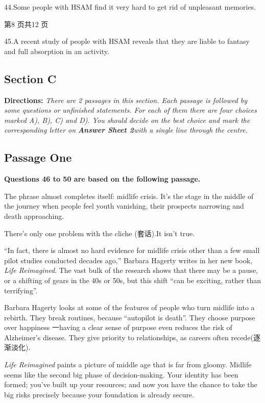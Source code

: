 \documentclass[UTF8,11pt]{ctexart}
\begin{document}
44.Some people with HSAM find it very hard to get rid of unpleasant memories.


第8 页共12 页


45.A recent study of people with HSAM reveals that they are liable to fantasy and full absorption in an activity.


\subsection*{\textbf{Section C}}


\textbf{Directions:}\textit{ There are 2 passages in this section. Each passage is followed by some questions or} \textit{unfinished statements. For each of them there are four choices marked A), B), C) and D). You should} \textit{decide on the best choice and mark the corresponding letter on}\textbf{\textit{ Answer Sheet 2}}\textit{with a single line through} \textit{the centre.}


\subsection*{\textbf{Passage One}}


\textbf{Questions 46 to 50 are based on the following passage.}


The phrase almost completes itself: midlife crisis. It’s the stage in the middle of the journey when people feel youth vanishing, their prospects narrowing and death approaching.


There’s only one problem with the cliche (套话).It isn’t true.


“In fact, there is almost no hard evidence for midlife crisis other than a few small pilot studies conducted decades ago,” Barbara Hagerty writes in her new book,\textit{ Life Reimagined}. The vast bulk of the research shows that there may be a pause, or a shifting of gears in the 40s or 50s, but this shift “can be exciting, rather than terrifying”.


Barbara Hagerty looks at some of the features of people who turn midlife into a rebirth. They break routines, because “autopilot is death”. They choose purpose over happiness 一having a clear sense of purpose even reduces the risk of Alzheimer’s disease. They give priority to relationships, as careers often recede(逐渐淡化).


\textit{Life Reimagined} paints a picture of middle age that is far from gloomy. Midlife seems like the second big phase of decision-making. Your identity has been formed; you’ve built up your resources; and now you have the chance to take the big risks precisely because your foundation is already secure.
\end{document}
